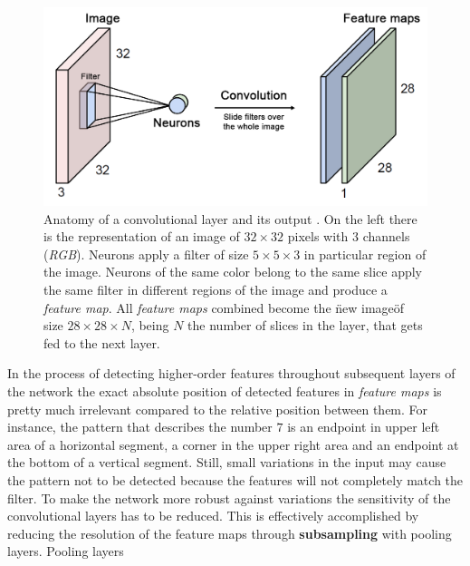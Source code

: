 \begin{figure}[htb]
  \includegraphics[width=\textwidth]{gfx/conv-layer-2}
  \caption{Anatomy of a convolutional layer and its output \cite{Guerzhoy2016}. On the left there is the representation of an image of ${32}\times{32}$ pixels with $3$ channels (\emph{RGB}). Neurons apply a filter of size ${5}\times{5}\times{3}$ in particular region of the image. Neurons of the same color belong to the same slice apply the same filter in different regions of the image and produce a \emph{feature map}. All \emph{feature maps} combined become the \"new image\" of size ${28}\times{28}\times{N}$, being $N$ the number of slices in the layer, that gets fed to the next layer.}
  \label{fig:sec:concepts:conv-layer-2}
\end{figure}

In the process of detecting higher-order features throughout subsequent layers of the network the exact absolute position of detected features in \emph{feature maps} is pretty much irrelevant compared to the relative position between them.
For instance, the pattern that describes the number $7$ is an endpoint in upper left area of a horizontal segment, a corner in the upper right area and an endpoint at the bottom of a vertical segment.
Still, small variations in the input may cause the pattern not to be detected because the features will not completely match the filter.
To make the network more robust against variations the sensitivity of the convolutional layers has to be reduced.
This is effectively accomplished by reducing the resolution of the feature maps through \textbf{subsampling} with pooling layers.
Pooling layers




